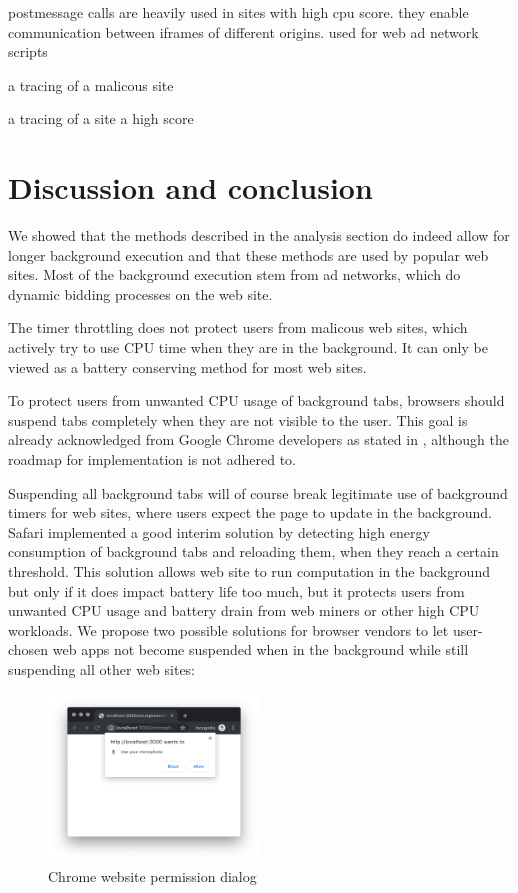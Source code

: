 \documentclass[
	ngerman,
	ruledheaders=section,%
	class=report,%
	thesis={type=bachelor},%
	accentcolor=9c,%
	custommargins=true,%
	marginpar=false,%
	parskip=half-,%
	fontsize=11pt,%
]{tudapub}
\begin{document}
  postmessage calls are heavily used in sites with high cpu score. they enable communication between iframes of different origins. used for web ad network scripts

  a tracing of a malicous site

  a tracing of a site a high score

  
  
  
  \newpage
  \chapter{Discussion and conclusion}

  We showed that the methods described in the analysis section do indeed allow for longer background execution and that these methods are used by popular web sites. Most of the background execution stem from ad networks, which do dynamic bidding processes on the web site. 

  The timer throttling does not protect users from malicous web sites, which actively try to use CPU time when they are in the background. It can only be viewed as a battery conserving method for most web sites.

  To protect users from unwanted CPU usage of background tabs, browsers should suspend tabs completely when they are not visible to the user. This goal is already acknowledged from Google Chrome developers as stated in \cite{chrome-background-tabs-roadmap}, although the roadmap for implementation is not adhered to.

  Suspending all background tabs will of course break legitimate use of background timers for web sites, where users expect the page to update in the background. Safari implemented a good interim solution by detecting high energy consumption of background tabs and reloading them, when they reach a certain threshold. This solution allows web site to run computation in the background but only if it does impact battery life too much, but it protects users from unwanted CPU usage and battery drain from web miners or other high CPU workloads. We propose two possible solutions for browser vendors to let user-chosen web apps not become suspended when in the background while still suspending all other web sites:

  \begin{figure}
    \centering
    \includegraphics[width=0.5\textwidth]{images/microphone-permission.png}
    \caption{Chrome website permission dialog}
    \label{fig:chrome-permission-dialog}
  \end{figure}
\end{document}
